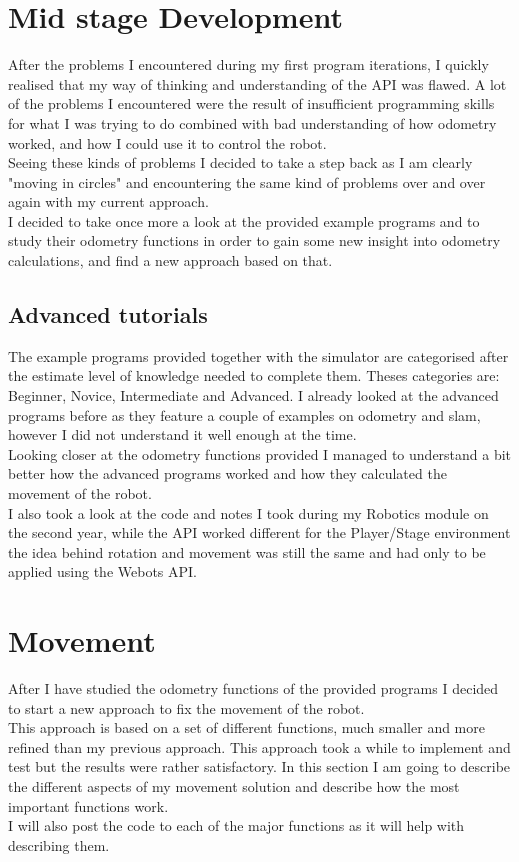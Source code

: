 \section{Mid stage Development}
After the problems I encountered during my first program iterations, I quickly realised that my way of thinking and understanding of the API was flawed. A lot of the problems I encountered were the result of insufficient programming skills for what I was trying to do combined with bad understanding of how odometry worked, and how I could use it to control the robot.\\
Seeing these kinds of problems I decided to take a step back as I am clearly "moving in circles" and encountering the same kind of problems over and over again with my current approach. \\
I decided to take once more a look at the provided example programs and to study their odometry functions in order to gain some new insight into odometry calculations, and find a new approach based on that.

\subsection{Advanced tutorials}
The example programs provided together with the simulator are categorised after the estimate level of knowledge needed to complete them. Theses categories are: Beginner, Novice, Intermediate and Advanced. I already looked at the advanced programs before as they feature a couple of examples on odometry and slam, however I did not understand it well enough at the time.\\
Looking closer at the odometry functions provided I managed to understand a bit better how the advanced programs worked and how they calculated the movement of the robot. \\[3ex]

I also took a look at the code and notes I took during my Robotics module on the second year, while the API worked different for the Player/Stage environment the idea behind rotation and movement was still the same and had only to be applied using the Webots API.

\section{Movement}
After I have studied the odometry functions of the provided programs I decided to start a new approach to fix the movement of the robot.\\
This approach is based on a set of different functions, much smaller and more refined than my previous approach. This approach took a while to implement and test but the results were rather satisfactory. In this section I am going to describe the different aspects of my movement solution and describe how the most important functions work.\\
I will also post the code to each of the major functions as it will help with describing them. 

